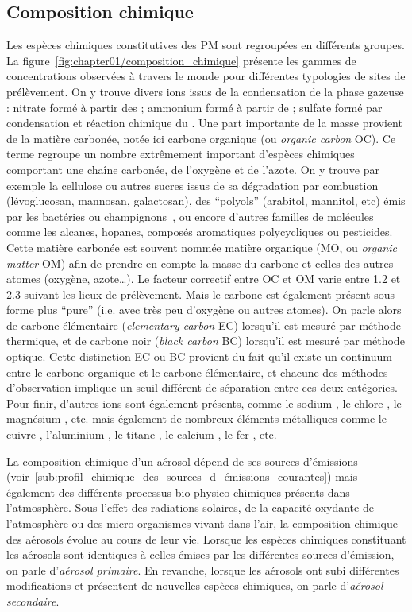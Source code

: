 \subsection{Composition chimique}%
\label{ssub:composition_chimique}

Les espèces chimiques constitutives des PM sont regroupées en différents groupes. La
figure~\ref{fig:chapter01/composition_chimique} présente les gammes de concentrations
observées à travers le monde pour différentes typologies de sites de prélèvement.
On y trouve divers ions issus de la condensation de la phase gazeuse : nitrate \NOt{} formé à
partir des ; ammonium \NHq{} formé à partir de \NHt; sulfate \SOq{} formé par
condensation et réaction chimique du .
Une part importante de la masse provient de la matière carbonée, notée ici
carbone organique (ou \textit{organic carbon} OC). Ce terme regroupe un nombre extrêmement
important d'espèces chimiques comportant une chaîne carbonée, de l'oxygène et
de l'azote. On y trouve par exemple la cellulose ou autres sucres issus de sa
dégradation par combustion (lévoglucosan, mannosan, galactosan), des ``polyols'' (arabitol,
mannitol, etc) émis par les bactéries ou champignons~\autocite{samakePolyols2019}, ou encore
d'autres familles de molécules comme les alcanes, hopanes, composés aromatiques
polycycliques ou pesticides. Cette matière carbonée est souvent nommée matière
organique (MO, ou \textit{organic matter} OM) afin de prendre en compte la masse du
carbone et celles des autres atomes (oxygène, azote…). Le facteur correctif entre OC et OM
varie entre 1.2 et 2.3 suivant les lieux de prélèvement.
Mais le carbone est également présent sous forme plus ``pure'' (i.e. avec très peu
d'oxygène ou autres atomes).
On parle alors de carbone élémentaire (\textit{elementary carbon} EC) lorsqu'il est mesuré
par méthode thermique, et de carbone noir (\textit{black carbon} BC) lorsqu'il est mesuré
par méthode optique. Cette distinction EC ou BC provient du fait qu'il existe un continuum
entre le carbone organique et le carbone élémentaire, et chacune des méthodes
d'observation implique un seuil différent de séparation entre ces deux catégories.
Pour finir, d'autres ions sont également présents, comme le sodium , le chlore
, le magnésium , etc. mais également de nombreux éléments métalliques
comme le cuivre , l'aluminium , le titane , le calcium , le fer
, etc.

La composition chimique d'un aérosol dépend de ses sources d'émissions
(voir~\ref{sub:profil_chimique_des_sources_d_émissions_courantes}) mais également des
différents processus bio-physico-chimiques présents dans l'atmosphère. Sous l'effet des
radiations solaires, de la capacité oxydante de l'atmosphère ou des micro-organismes
vivant dans l'air, la composition chimique des aérosols évolue au cours de leur vie.
Lorsque les espèces chimiques constituant les aérosols sont identiques à celles émises par
les différentes sources d'émission, on parle d'\textit{aérosol primaire}. En revanche,
lorsque les aérosols ont subi différentes modifications et présentent de nouvelles espèces
chimiques, on parle d'\textit{aérosol secondaire}.

